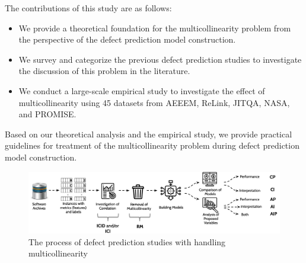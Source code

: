 
The contributions of this study are as follows:
\begin{itemize}
\item We provide a theoretical foundation for the multicollinearity problem from the perspective of the defect prediction model construction. 
\item We survey and categorize the previous defect prediction studies to investigate the discussion of this problem in the literature.
\item We conduct a large-scale empirical study to investigate the effect of multicollinearity using 45 datasets from AEEEM, ReLink, JIT\textunderscore QA, NASA, and PROMISE.
\end{itemize}
Based on our theoretical analysis and the empirical study, we provide practical guidelines for treatment of the  multicollinearity problem during defect prediction model construction.

\begin{figure}[t]
	\centering
	\includegraphics[width=\linewidth]{figures/eight_actions.png}
	\caption{The process of defect prediction studies with handling multicollinearity}
	\label{fig:eight_actions}
\end{figure}

